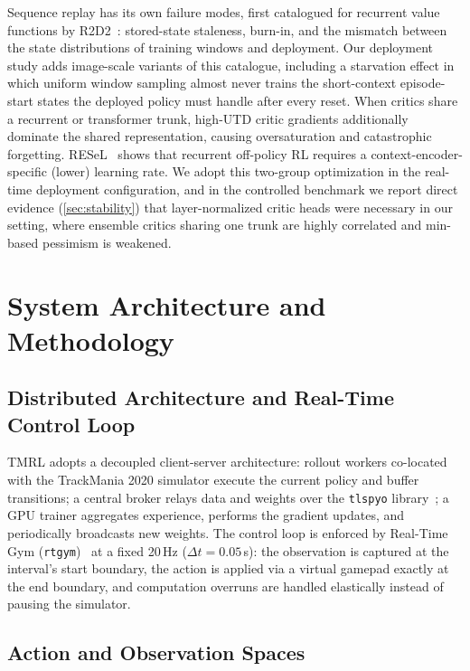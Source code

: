 \documentclass[conference]{IEEEtran}
\begin{document}
Sequence replay has its own failure modes, first catalogued for recurrent value functions by R2D2~\cite{r2d2}: stored-state staleness, burn-in, and the mismatch between the state distributions of training windows and deployment. Our deployment study adds image-scale variants of this catalogue, including a starvation effect in which uniform window sampling almost never trains the short-context episode-start states the deployed policy must handle after every reset. When critics share a recurrent or transformer trunk, high-UTD critic gradients additionally dominate the shared representation, causing oversaturation and catastrophic forgetting. RESeL~\cite{resel} shows that recurrent off-policy RL requires a context-encoder-specific (lower) learning rate. We adopt this two-group optimization in the real-time deployment configuration, and in the controlled benchmark we report direct evidence (\cref{sec:stability}) that layer-normalized critic heads were necessary in our setting, where ensemble critics sharing one trunk are highly correlated and min-based pessimism is weakened.



\section{System Architecture and Methodology}

\label{sec:methodology}



\subsection{Distributed Architecture and Real-Time Control Loop}

TMRL adopts a decoupled client-server architecture: rollout workers co-located with the TrackMania 2020 simulator execute the current policy and buffer transitions; a central broker relays data and weights over the \texttt{tlspyo} library~\cite{tlspyo}; a GPU trainer aggregates experience, performs the gradient updates, and periodically broadcasts new weights. The control loop is enforced by Real-Time Gym (\texttt{rtgym})~\cite{rtgym} at a fixed 20\,Hz ($\Delta t = 0.05$\,s): the observation is captured at the interval's start boundary, the action is applied via a virtual gamepad exactly at the end boundary, and computation overruns are handled elastically instead of pausing the simulator.



\subsection{Action and Observation Spaces}
\end{document}

